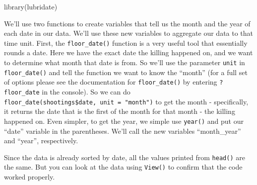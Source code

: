 \documentclass[
]{krantz}
\makeatletter
\newenvironment{Shaded}{\begin{snugshade}}{\end{snugshade}}
\newcommand{\AttributeTok}[1]{\textcolor[rgb]{0.61,0.61,0.61}{#1}}
\newcommand{\CommentTok}[1]{\textcolor[rgb]{0.37,0.37,0.37}{\textit{#1}}}
\newcommand{\FunctionTok}[1]{\textcolor[rgb]{0,0,0}{#1}}
\newcommand{\NormalTok}[1]{#1}
\newcommand{\OtherTok}[1]{\textcolor[rgb]{0.37,0.37,0.37}{#1}}
\newcommand{\SpecialCharTok}[1]{\textcolor[rgb]{0,0,0}{#1}}
\newcommand{\StringTok}[1]{\textcolor[rgb]{0.5,0.5,0.5}{#1}}
\newenvironment{kframe}{%
\medskip{}
\setlength{\fboxsep}{.8em}
 \def\at@end@of@kframe{}%
 \ifinner\ifhmode%
  \def\at@end@of@kframe{\end{minipage}}%
  \begin{minipage}{\columnwidth}%
 \fi\fi%
 \def\FrameCommand##1{\hskip\@totalleftmargin \hskip-\fboxsep
 \colorbox{shadecolor}{##1}\hskip-\fboxsep
     \hskip-\linewidth \hskip-\@totalleftmargin \hskip\columnwidth}%
 \MakeFramed {\advance\hsize-\width
   \@totalleftmargin\z@ \linewidth\hsize
   \@setminipage}}%
 {\par\unskip\endMakeFramed%
 \at@end@of@kframe}
\renewenvironment{Shaded}{\begin{kframe}}{\end{kframe}}
\makeatother
\begin{document}
\begin{Shaded}
\begin{Highlighting}[]
\FunctionTok{library}\NormalTok{(lubridate)}
\end{Highlighting}
\end{Shaded}

We'll use two functions to create variables that tell us the month and the year of each date in our data. We'll use these new variables to aggregate our data to that time unit. First, the \texttt{floor\_date()} function is a very useful tool that essentially rounds a date. Here we have the exact date the killing happened on, and we want to determine what month that date is from. So we'll use the parameter \texttt{unit} in \texttt{floor\_date()} and tell the function we want to know the ``month'' (for a full set of options please see the documentation for \texttt{floor\_date()} by entering \texttt{?floor\_date} in the console). So we can do \texttt{floor\_date(shootings\$date,\ unit\ =\ "month")} to get the month - specifically, it returns the date that is the first of the month for that month - the killing happened on. Even simpler, to get the year, we simple use \texttt{year()} and put our ``date'' variable in the parentheses. We'll call the new variables ``month\_year'' and ``year'', respectively.

\begin{Shaded}
\end{Shaded}

Since the data is already sorted by date, all the values printed from \texttt{head()} are the same. But you can look at the data using \texttt{View()} to confirm that the code worked properly.
\end{document}
